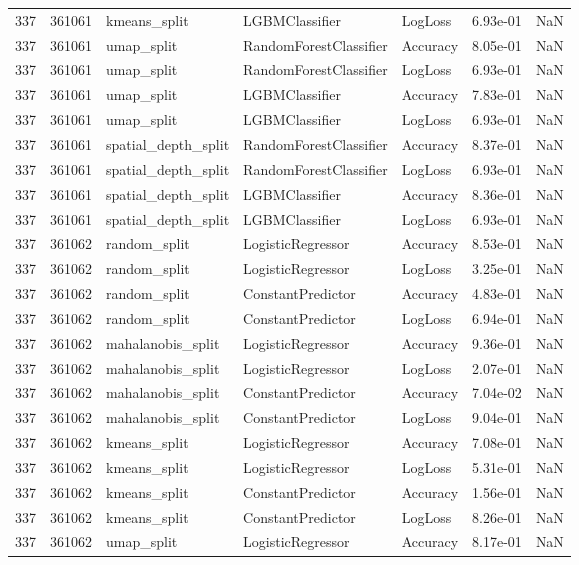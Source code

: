 \begin{tabular}{rrlllrr}
337 & 361061 & kmeans\_split & LGBMClassifier & LogLoss & 6.93e-01 & NaN \\
337 & 361061 & umap\_split & RandomForestClassifier & Accuracy & 8.05e-01 & NaN \\
337 & 361061 & umap\_split & RandomForestClassifier & LogLoss & 6.93e-01 & NaN \\
337 & 361061 & umap\_split & LGBMClassifier & Accuracy & 7.83e-01 & NaN \\
337 & 361061 & umap\_split & LGBMClassifier & LogLoss & 6.93e-01 & NaN \\
337 & 361061 & spatial\_depth\_split & RandomForestClassifier & Accuracy & 8.37e-01 & NaN \\
337 & 361061 & spatial\_depth\_split & RandomForestClassifier & LogLoss & 6.93e-01 & NaN \\
337 & 361061 & spatial\_depth\_split & LGBMClassifier & Accuracy & 8.36e-01 & NaN \\
337 & 361061 & spatial\_depth\_split & LGBMClassifier & LogLoss & 6.93e-01 & NaN \\
337 & 361062 & random\_split & LogisticRegressor & Accuracy & 8.53e-01 & NaN \\
337 & 361062 & random\_split & LogisticRegressor & LogLoss & 3.25e-01 & NaN \\
337 & 361062 & random\_split & ConstantPredictor & Accuracy & 4.83e-01 & NaN \\
337 & 361062 & random\_split & ConstantPredictor & LogLoss & 6.94e-01 & NaN \\
337 & 361062 & mahalanobis\_split & LogisticRegressor & Accuracy & 9.36e-01 & NaN \\
337 & 361062 & mahalanobis\_split & LogisticRegressor & LogLoss & 2.07e-01 & NaN \\
337 & 361062 & mahalanobis\_split & ConstantPredictor & Accuracy & 7.04e-02 & NaN \\
337 & 361062 & mahalanobis\_split & ConstantPredictor & LogLoss & 9.04e-01 & NaN \\
337 & 361062 & kmeans\_split & LogisticRegressor & Accuracy & 7.08e-01 & NaN \\
337 & 361062 & kmeans\_split & LogisticRegressor & LogLoss & 5.31e-01 & NaN \\
337 & 361062 & kmeans\_split & ConstantPredictor & Accuracy & 1.56e-01 & NaN \\
337 & 361062 & kmeans\_split & ConstantPredictor & LogLoss & 8.26e-01 & NaN \\
337 & 361062 & umap\_split & LogisticRegressor & Accuracy & 8.17e-01 & NaN \\

\end{tabular}
